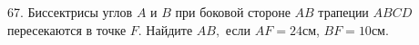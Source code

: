 67. Биссектрисы углов $A$ и $B$ при боковой стороне $AB$ трапеции $ABCD$ пересекаются в точке $F.$ Найдите $AB,$ если $AF=24$см, $BF=10$см.\\
